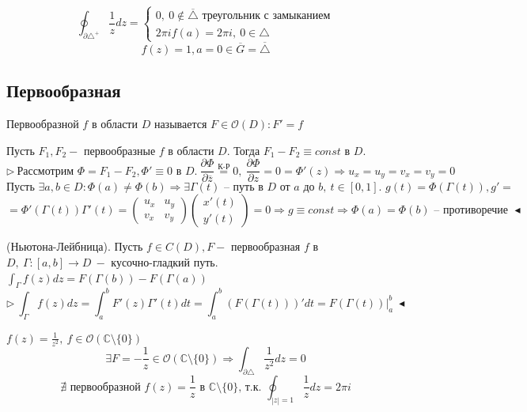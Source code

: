 \[\oint_{\partial \triangle^+} \frac{1}{z} dz = \begin{cases}
    0, \ 0\notin \overline{\triangle} \text{ треугольник с замыканием} \\
    2\pi i f(a) = 2\pi i, \ 0 \in \triangle
\end{cases}\]
\[f(z) = 1, a = 0\in \overline{G} = \overline{\triangle}\]

\subsection{Первообразная}
 Первообразной $f$ в области $D$ называется $F \in \mathcal{O}(D): F' = f$

 Пусть $F_1, F_2 -$ первообразные $f$ в области $D$. Тогда $F_1-F_2 \equiv  const$ в $D$.
\[\triangleright \ \text{Рассмотрим } \Phi = F_1 - F_2, \Phi' \equiv 0 \text{ в } D. \ \frac{\partial \Phi}{\partial \overline{z}} \overset{\text{К-Р}}{=} 0, \ \frac{\partial \Phi}{\partial z} = 0 = \Phi'(z) \Rightarrow u_x = u_y = v_x = v_y = 0\]
\[\text{Пусть } \exists a, b \in D: \Phi(a) \neq \Phi(b) \Rightarrow \exists \Gamma(t) \text{ -- путь в $D$ от $a$ до $b, \ t \in [0, 1]$. } g(t) = \Phi(\Gamma(t)), g' =\] 
\[=\Phi'(\Gamma(t)) \Gamma'(t) = \left(\begin{array}{ll}
    u_x & u_y \\
    v_x & v_y    
\end{array}\right) \left(\begin{array}{ll}
    x'(t) \\
    y'(t)
\end{array}\right) = 0 \Rightarrow g \equiv const \Rightarrow \Phi(a) = \Phi(b) \text{ -- противоречие } \blacktriangleleft\]

 (Ньютона-Лейбница). Пусть $f \in C(D), F -$ первообразная $f$ в $D, \ \Gamma:[a, b] \to D \ -$ кусочно-гладкий путь. $\int_\Gamma f(z) dz = F(\Gamma(b)) - F(\Gamma(a))$
\[\triangleright \ \int_\Gamma f(z) dz = \int_a^b F'(z) \Gamma'(t) dt = \int_a^b (F(\Gamma(t)))' dt = F(\Gamma(t))\Big|_a^b \ \blacktriangleleft\]

 $f(z) = \frac{1}{z^2}, \ f \in \mathcal{O} (\mathbb{C} \setminus \{0\})$
\[\exists F = -\frac{1}{z} \in \mathcal{O} (\mathbb{C} \setminus \{0\}) \Rightarrow \int_{\partial \triangle} \frac{1}{z^2} dz = 0\]
\[\nexists \text{ первообразной } f(z) = \frac{1}{z} \text{ в } \mathbb{C} \setminus \{0\} \text{, т.к. } \oint_{|z|=1} \frac{1}{z} dz = 2\pi i\]

